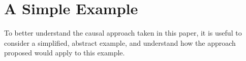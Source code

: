 \section{A Simple Example}

To better understand the causal approach taken in this paper, it is useful to consider a simplified, abstract example, and understand how the approach proposed would apply to this example.